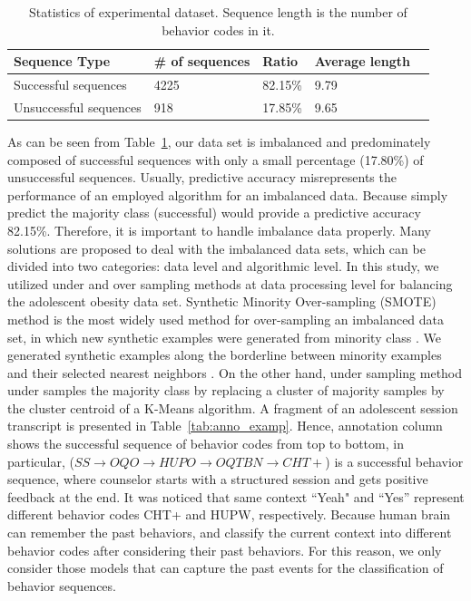 \documentclass{amia_summit_2018}
\begin{document}
\begin{table}[h]
\centering
\caption{Statistics of experimental dataset. Sequence length is the number of behavior codes in it.}
\label{tab:data_dist}
  \begin{tabular}{|l|l|l|l|l|}
  \hline
   \textbf{Sequence Type} & \textbf{\# of sequences}  & \textbf{Ratio} & \textbf{Average length} \\ \hline      
Successful sequences & 4225 & 82.15\% & 9.79 \\\hline
Unsuccessful sequences & 918 & 17.85\% & 9.65 \\\hline
  \end{tabular}
\end{table} 

As can be seen from Table~\ref{tab:data_dist}, our data set is imbalanced and predominately composed of successful sequences with only a small percentage (17.80\%) of unsuccessful sequences. Usually, predictive accuracy misrepresents the performance of an employed algorithm for an imbalanced data. Because simply predict the majority class (successful) would provide a predictive accuracy 82.15\%. Therefore, it is important to handle imbalance data properly. Many solutions are proposed to deal with the imbalanced data sets, which can be divided into two categories: data level and algorithmic level. In this study, we utilized under and over sampling methods at data processing level for balancing the adolescent obesity data set. Synthetic Minority Over-sampling (SMOTE) method is the most widely used method for over-sampling an imbalanced data set, in which new synthetic examples were generated from minority class \cite{chawla2002smote}. We generated synthetic examples along the borderline between minority examples and their selected nearest neighbors \cite{nguyen2011borderline}. On the other hand, under sampling method under samples the majority class by replacing a cluster of majority samples by the cluster centroid of a K-Means algorithm.  A fragment of an adolescent session transcript is presented in Table~\ref{tab:anno_examp}. Hence, annotation column shows the successful sequence of behavior codes from top to bottom, in particular, ($SS\rightarrow OQO\rightarrow HUPO\rightarrow OQTBN\rightarrow CHT+$) is a successful behavior sequence, where counselor starts with a structured session and gets positive feedback at the end. It was noticed that same context ``Yeah" and ``Yes'' represent different behavior codes CHT+ and HUPW, respectively. Because human brain can remember the past behaviors, and classify the current context into different behavior codes after considering their past behaviors. For this reason, we only consider those models that can capture the past events for the classification of behavior sequences.\\
\end{document}
